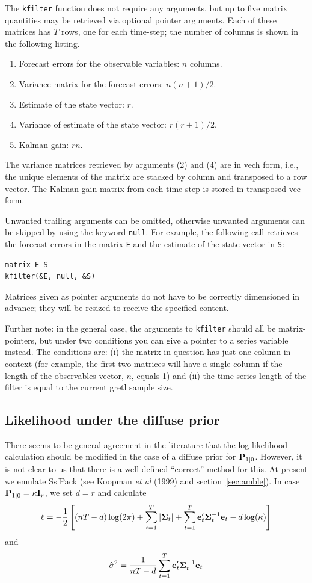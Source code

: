 \documentclass[a4paper]{article}
\newcommand{\statevar}{\ensuremath\mathbf{P}}
\newcommand{\prederr}{\ensuremath\mathbf{e}}
\newcommand{\predvar}{\ensuremath{\bm\Sigma}}
\begin{document}
The \texttt{kfilter} function does not require any arguments, but up
to five matrix quantities may be retrieved via optional pointer
arguments.  Each of these matrices has $T$ rows, one for each
time-step; the number of columns is shown in the following listing.
%
\begin{enumerate}
\item Forecast errors for the observable variables: $n$ columns.
\item Variance matrix for the forecast errors: $n(n+1)/2$.
\item Estimate of the state vector: $r$.
\item Variance of estimate of the state vector: $r(r+1)/2$.
\item Kalman gain: $rn$.
\end{enumerate}

The variance matrices retrieved by arguments (2) and (4) are in vech
form, i.e., the unique elements of the matrix are stacked by column
and transposed to a row vector.  The Kalman gain matrix from each time
step is stored in transposed vec form.

Unwanted trailing arguments can be omitted, otherwise unwanted
arguments can be skipped by using the keyword \texttt{null}.  For
example, the following call retrieves the forecast errors in the
matrix \texttt{E} and the estimate of the state vector in \texttt{S}:
%
\begin{verbatim}
matrix E S
kfilter(&E, null, &S)
\end{verbatim}

Matrices given as pointer arguments do not have to be correctly
dimensioned in advance; they will be resized to receive the specified
content.

Further note: in the general case, the arguments to \texttt{kfilter}
should all be matrix-pointers, but under two conditions you can give a
pointer to a series variable instead.  The conditions are: (i) the
matrix in question has just one column in context (for example, the
first two matrices will have a single column if the length of the
observables vector, $n$, equals 1) and (ii) the time-series length of
the filter is equal to the current gretl sample size.

\subsection{Likelihood under the diffuse prior}

There seems to be general agreement in the literature that the
log-likelihood calculation should be modified in the case of a diffuse
prior for $\statevar_{1|0}$.  However, it is not clear to us that
there is a well-defined ``correct'' method for this.  At present we
emulate \textsf{SsfPack} (see Koopman \textit{et al} (1999) and
section~\ref{sec:amble}).  In case $\statevar_{1|0} = \kappa
\mathbf{I}_r$, we set $d = r$ and calculate
%
\[
  \ell = -\frac{1}{2} \left[(nT-d) \log(2 \pi) + 
    \sum_{t=1}^T\left|\predvar_t\right| + 
    \sum_{t=1}^T\prederr_t'\predvar_t^{-1} \prederr_t
    - d \log(\kappa)
  \right]
\]
%
and
%
\[
\hat{\sigma}^2 = \frac{1}{nT-d} 
   \sum_{t=1}^T\prederr_t'\predvar_t^{-1} \prederr_t
\]
\end{document}
